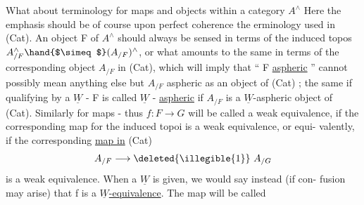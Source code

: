 What about terminology for maps and objects within a category $A^{\wedge}$
Here the emphasis should be of course upon perfect coherence 
the erminology used in (Cat). An object F of $A^{\wedge}$ should always be sensed
in terms of the induced topos $A^{\wedge}_{/F}\hand{$\simeq$}(A_{/F})^{\wedge}$, or what amounts to the same\hand{,}
in terms of the corresponding object $A_{/F}$ in (Cat), which will imply 
that `` F  \uline{aspheric} '' cannot possibly mean anything else but $A_{/F}$  aspheric
as an object of (Cat) ; the same if qualifying by a $\underline{W}$ - F is called
$\underline{W}$ - \uline{aspheric} if $A_{/F}$ is a $\underline{W}$-aspheric object of (Cat). Similarly\xout{,} for
maps - thus $f: F\to G$ will be called a weak equivalence, if the
corresponding map for the induced topoi is a weak equivalence, or equi-%
valently, if the corresponding \uline{map in} (Cat)
\[ A_{/F}\longrightarrow \deleted{\illegible{1}}\ A_{/G} \]
is a weak equivalence. When a $\underline{W}$ is given, we would say instead (if con-%
fusion may arise) that f is a \uline{$\underline{W}$-equivalence}. The map will be called

